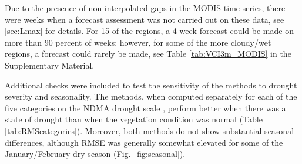 \documentclass[review]{elsarticle}
\begin{document}


Due to the presence of non-interpolated gaps in the MODIS time series, there were weeks when a forecast assessment was not carried out on these data, see \ref{sec:Lmax} for details.  For 15 of the regions, a 4 week forecast could be made on more than 90 percent of weeks; however, for some of the more cloudy/wet regions, a forecast could rarely be made, see Table \ref{tab:VCI3m_MODIS} in the Supplementary Material.

Additional checks were included to test the sensitivity of the methods to drought severity and seasonality. 
The methods, when computed separately for each of the five categories on the NDMA drought scale \citep{rs8040267}, perform better when there was a state of drought than when the vegetation condition was normal (Table \ref{tab:RMScategories}).
Moreover, both methods do not show substantial seasonal differences, although RMSE was generally somewhat elevated for some of the January/February dry season (Fig.~\ref{fig:seasonal}).

\end{document}
